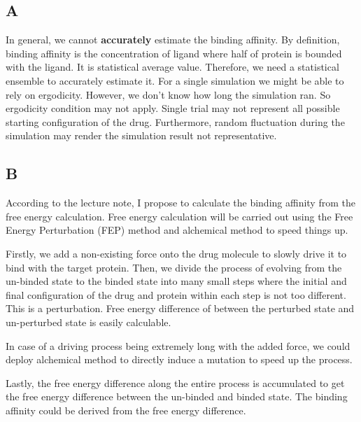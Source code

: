 \documentclass[11pt]{article}
\begin{document}
\subsection{A}
\label{sec:orgf1e38f0}
In general, we cannot \textbf{accurately} estimate the binding affinity. By definition,
binding affinity is the concentration of ligand where half of protein is bounded
with the ligand. It is statistical average value. Therefore, we need a
statistical ensemble to accurately estimate it. For a single simulation we might
be able to rely on ergodicity. However, we don't know how long the simulation
ran. So ergodicity condition may not apply. Single trial may not represent all
possible starting configuration of the drug. Furthermore, random fluctuation
during the simulation may render the simulation result not representative.

\subsection{B}
\label{sec:orgf70085f}
According to the lecture note, I propose to calculate the binding affinity from
the free energy calculation. Free energy calculation will be carried out using
the Free Energy Perturbation (FEP) method and alchemical method to speed things
up.

Firstly, we add a non-existing force onto the drug molecule to slowly drive it
to bind with the target protein. Then, we divide the process of evolving from
the un-binded state to the binded state into many small steps where the initial
and final configuration of the drug and protein within each step is not too
different. This is a perturbation. Free energy difference of between the
perturbed state and un-perturbed state is easily calculable.

In case of a driving process being extremely long with the added force, we could
deploy alchemical method to directly induce a mutation to speed up the process.

Lastly, the free energy difference along the entire process is accumulated to
get the free energy difference between the un-binded and binded state. The
binding affinity could be derived from the free energy difference.
\end{document}
